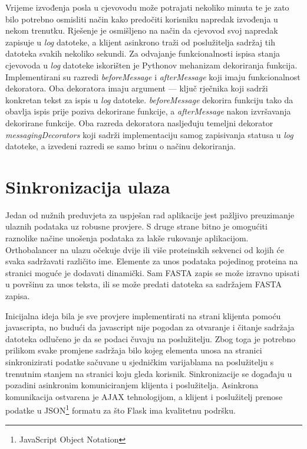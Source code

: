     
Vrijeme izvođenja posla u cjevovodu može potrajati nekoliko minuta te je zato
bilo potrebno osmisliti način kako predočiti korisniku napredak izvođenja u
nekom trenutku. Rješenje je osmišljeno na način da cjevovod svoj napredak
zapisuje u \emph{log} datoteke, a klijent asinkrono traži od poslužitelja
sadržaj tih datoteka svakih nekoliko sekundi. Za odvajanje funkcionalnosti
ispisa stanja cjevovoda u \emph{log} datoteke iskorišten je Pythonov mehanizam
dekoriranja funkcija. Implementirani su razredi \emph{beforeMessage} i
\emph{afterMessage} koji imaju funkcionalnost dekoratora. Oba dekoratora imaju
argument --- ključ rječnika koji sadrži konkretan tekst za ispis u \emph{log}
datoteke. \emph{beforeMessage} dekorira funkciju tako da obavlja ispis prije
poziva dekorirane funkcije, a \emph{afterMessage} nakon izvršavanja dekorirane
funkcije. Oba razreda dekoratora nasljeđuju temeljni dekorator
\emph{messagingDecorators} koji sadrži implementaciju samog zapisivanja statusa
u \emph{log} datoteke, a izvedeni razredi se samo brinu o načinu dekoriranja.



\section{Sinkronizacija ulaza}
\label{sec:input}


Jedan od nužnih preduvjeta za uspješan rad aplikacije jest pažljivo preuzimanje
ulaznih podataka uz robusne provjere. S druge strane bitno je omogućiti
raznolike načine unošenja podataka za lakše rukovanje aplikacijom. Orthobalancer
na ulazu očekuje dvije ili više proteinskih sekvenci od kojih će svaka
sadržavati različito ime. Elemente za unos podataka pojedinog proteina na
stranici moguće je dodavati dinamički. Sam FASTA zapis se može izravno upisati u
površinu za unos teksta, ili se može predati datoteka sa sadržajem FASTA zapisa.

Inicijalna ideja bila je sve provjere implementirati na strani klijenta pomoću
javascripta, no budući da javascript nije pogodan za otvaranje i čitanje
sadržaja datoteka odlučeno je da se podaci čuvaju na poslužitelju. Zbog toga je
potrebno prilikom svake promjene sadržaja bilo kojeg elementa unosa na stranici
sinkronizirati podatke sačuvane u sjedničkim varijablama na poslužitelju s
trenutnim stanjem na stranici koju gleda korisnik. Sinkronizacije se događaju u
pozadini asinkronim komuniciranjem klijenta i poslužitelja. Asinkrona
komunikacija ostvarena je AJAX tehnologijom, a klijent i poslužitelj prenose
podatke u JSON\footnote{JavaScript Object Notation} formatu za što Flask ima
kvalitetnu podršku.

